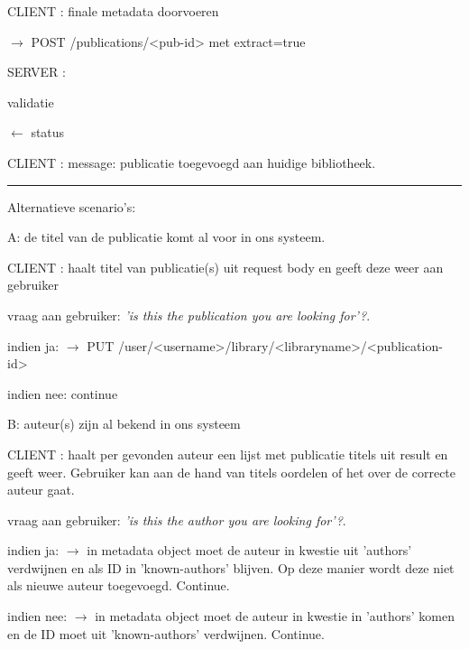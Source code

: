 \documentclass{article}
\begin{document}
\begin{description}
	
\item CLIENT : finale metadata doorvoeren 
	\begin{description}
	\item $\rightarrow$ POST /publications/<pub-id> met extract=true
	\end{description}


\item SERVER :  
	\begin{description}
	\item \checkmark validatie
	\item $\leftarrow$ status 
	\end{description}
	
\item CLIENT :  message: publicatie toegevoegd aan huidige bibliotheek.

 \end{description}
 
 
\vspace{2 mm}
\hrule
\vspace{2 mm}
 
\noindent Alternatieve scenario's: 

\begin{description}

\item A: de titel van de publicatie komt al voor in ons systeem. 
 	\begin{description}
 	\item CLIENT : haalt titel van publicatie(s) uit request body en geeft deze weer aan gebruiker
 		\begin{description}
		\item vraag aan gebruiker:  \emph{'is this the publication you are looking for'?}. 
		\item indien ja:  $\rightarrow$ PUT /user/<username>/library/<libraryname>/<publication-id>
		\item indien nee: continue
		\end{description}
  	\end{description}
\item B:  auteur(s) zijn al bekend in ons systeem
 	\begin{description}
 	\item CLIENT : haalt per gevonden auteur een lijst met publicatie titels uit result en geeft weer. Gebruiker kan aan de hand van titels oordelen of het over de correcte auteur gaat. 
 		\begin{description}
		\item vraag aan gebruiker:  \emph{'is this the author you are looking for'?}. 
		\item indien ja:  $\rightarrow$ in metadata object moet de auteur in kwestie uit 'authors' verdwijnen en als ID in 'known-authors' blijven. Op deze manier wordt deze niet als nieuwe auteur toegevoegd. Continue.
		\item indien nee: $\rightarrow$ in metadata object moet de auteur in kwestie in 'authors' komen en de ID moet uit 'known-authors' verdwijnen. Continue. 
		\end{description}
  	\end{description}
  
 \end{description}
\end{document}
